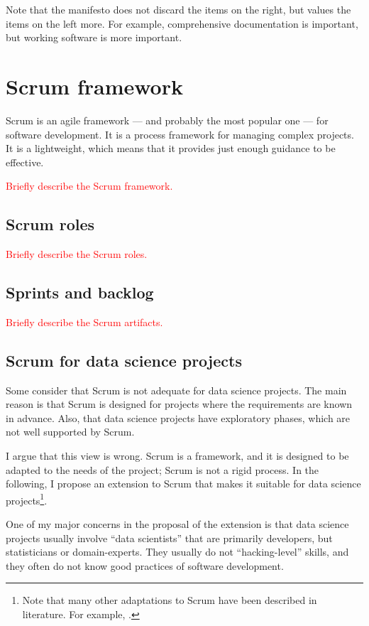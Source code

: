 Note that the manifesto does not discard the items on the right, but values the items on
the left more.  For example, comprehensive documentation is important, but working software
is more important.

\section{Scrum framework}

Scrum is an agile framework --- and probably the most popular one ---
for software development.  It is a process framework for
managing complex projects.  It is a lightweight, which means that it
provides just enough guidance to be effective.

\textcolor{red}{Briefly describe the Scrum framework.}

\subsection{Scrum roles}

\textcolor{red}{Briefly describe the Scrum roles.}

\subsection{Sprints and backlog}

\textcolor{red}{Briefly describe the Scrum artifacts.}

\subsection{Scrum for data science projects}

Some consider that Scrum is not adequate for data science projects.  The main reason is
that Scrum is designed for projects where the requirements are known in advance.  Also,
that data science projects have exploratory phases, which are not well supported by Scrum.

I argue that this view is wrong.  Scrum is a framework, and it is designed to be adapted to
the needs of the project;  Scrum is not a rigid process.  In the following, I propose an
extension to Scrum that makes it suitable for data science projects\footnote{Note that
many other adaptations to Scrum have been described in literature.  For example,
.}.

One of my major concerns in the proposal of the extension is that data science projects
usually involve ``data scientists'' that are primarily developers, but statisticians or
domain-experts.  They usually do not ``hacking-level'' skills, and they often do not know
good practices of software development.

